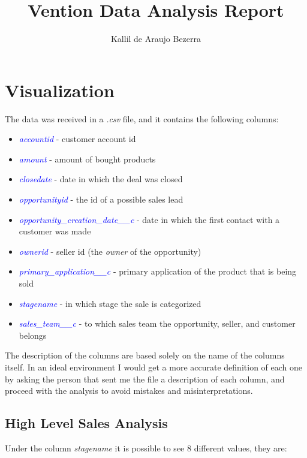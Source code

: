 \documentclass[]{report}
\title{Vention Data Analysis Report}
\author{Kallil de Araujo Bezerra}
\begin{document}
\maketitle


\tableofcontents

\chapter{Visualization}

The data was received in a \textit{.csv} file, and it contains the following columns:

\begin{itemize}
	\item \textcolor{blue}{\textit{accountid}} - customer account id
	\item \textcolor{blue}{\textit{amount}} - amount of bought products
	\item \textcolor{blue}{\textit{closedate}} - date in which the deal was closed
	\item \textcolor{blue}{\textit{opportunityid}} - the id of a possible sales lead
	\item \textcolor{blue}{\textit{opportunity\_creation\_date\_\_c}} - date in which the first contact with a customer was made
	\item \textcolor{blue}{\textit{ownerid}} - seller id (the \textit{owner} of the opportunity)
	\item \textcolor{blue}{\textit{primary\_application\_\_c}} - primary application of the product that is being sold
	\item \textcolor{blue}{\textit{stagename}} - in which stage the sale is categorized
	\item \textcolor{blue}{\textit{sales\_team\_\_c}} - to which sales team the opportunity, seller, and customer belongs
\end{itemize}

The description of the columns are based solely on the name of the columns itself. In an ideal environment I would get a more accurate definition of each one by asking the person that sent me the file a description of each column, and proceed with the analysis to avoid mistakes and misinterpretations.

\section{High Level Sales Analysis}

Under the column \textit{stagename} it is possible to see 8 different values, they are:
\end{document}
